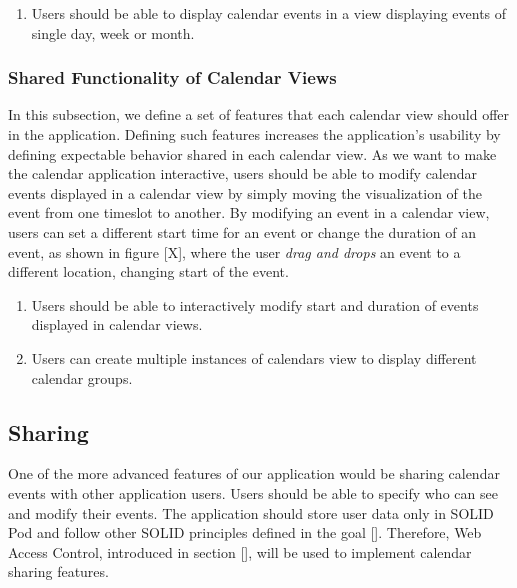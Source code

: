 \begin{enumerate}[label=\color{reqcolor}\textbf{R{\arabic*}}, resume]
    \item \label{app:req:views0} Users should be able to display calendar events in a view displaying events of single day, week or month.
\end{enumerate}

\subsubsection*{Shared Functionality of Calendar Views}
In this subsection, we define a set of features that each calendar view should offer in the application. Defining such features increases the application's usability by defining expectable behavior shared in each calendar view.
As we want to make the calendar application interactive, users should be able to modify calendar events displayed in a calendar view by simply moving the visualization of the event from one timeslot to another. By modifying an event in a calendar view, users can set a different start time for an event or change the duration of an event, as shown in figure [X], where the user \textit{drag and drops} an event to a different location, changing start of the event.

\begin{enumerate}[label=\color{reqcolor}\textbf{R{\arabic*}}, resume]
    \item \label{app:req:views1} Users should be able to interactively modify start and duration of events displayed in calendar views.
    \item \label{app:req:views2} Users can create multiple instances of calendars view to display different calendar groups.
\end{enumerate}

\subsection*{Sharing}

One of the more advanced features of our application would be sharing calendar events with other application users. Users should be able to specify who can see and modify their events. The application should store user data only in SOLID Pod and follow other SOLID principles defined in the goal []. Therefore, Web Access Control, introduced in section [], will be used to implement calendar sharing features.

